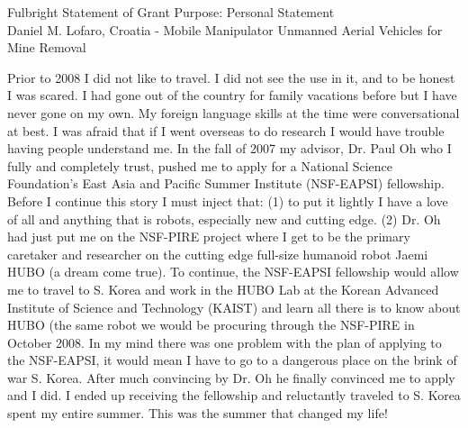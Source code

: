 \documentclass[12pt]{article}
\begin{document}
\begin{center}
Fulbright Statement of Grant Purpose: Personal Statement\\
Daniel M. Lofaro, Croatia - Mobile Manipulator Unmanned Aerial Vehicles for Mine Removal\\

\end{center}

\normalsize
Prior to 2008 I did not like to travel.  I did not see the use in it, and to be honest I was scared.  I had gone out of the country for family vacations before but I have never gone on my own.  My foreign language skills at the time were conversational at best.  I was afraid that if I went overseas to do research I would have trouble having people understand me.  In the fall of 2007 my advisor, Dr. Paul Oh who I fully and completely trust, pushed me to apply for a National Science Foundation’s East Asia and Pacific Summer Institute (NSF-EAPSI) fellowship.  Before I continue this story I must inject that: (1) to put it lightly I have a love of all and anything that is robots, especially new and cutting edge.  (2) Dr. Oh had just put me on the NSF-PIRE project where I get to be the primary caretaker and researcher on the cutting edge full-size humanoid robot Jaemi HUBO (a dream come true).  To continue, the NSF-EAPSI fellowship would allow me to travel to S. Korea and work in the HUBO Lab at the Korean Advanced Institute of Science and Technology (KAIST) and learn all there is to know about HUBO (the same robot we would be procuring through the NSF-PIRE in October 2008.  In my mind there was one problem with the plan of applying to the NSF-EAPSI, it would mean I have to go to a dangerous place on the brink of war S. Korea.  After much convincing by Dr. Oh he finally convinced me to apply and I did.  I ended up receiving the fellowship and reluctantly traveled to S. Korea spent my entire summer.  This was the summer that changed my life!  
\end{document}

